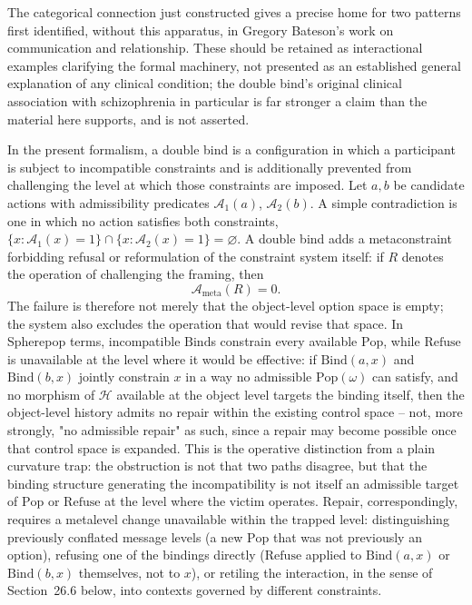 \documentclass[11pt]{article}
\newcommand{\Pop}{\mathrm{Pop}}
\newcommand{\Refuse}{\mathrm{Refuse}}
\newcommand{\Bind}{\mathrm{Bind}}
\begin{document}
The categorical connection just constructed gives a precise home for two patterns first identified, without this apparatus, in Gregory Bateson's work on communication and relationship. These should be retained as interactional examples clarifying the formal machinery, not presented as an established general explanation of any clinical condition; the double bind's original clinical association with schizophrenia in particular is far stronger a claim than the material here supports, and is not asserted.

In the present formalism, a double bind is a configuration in which a participant is subject to incompatible constraints and is additionally prevented from challenging the level at which those constraints are imposed. Let $a, b$ be candidate actions with admissibility predicates $\mathcal{A}_1(a)$, $\mathcal{A}_2(b)$. A simple contradiction is one in which no action satisfies both constraints, $\{x : \mathcal{A}_1(x) = 1\} \cap \{x : \mathcal{A}_2(x) = 1\} = \varnothing$. A double bind adds a metaconstraint forbidding refusal or reformulation of the constraint system itself: if $R$ denotes the operation of challenging the framing, then
\[
\mathcal{A}_{\mathrm{meta}}(R) = 0.
\]
The failure is therefore not merely that the object-level option space is empty; the system also excludes the operation that would revise that space. In Spherepop terms, incompatible $\Bind$s constrain every available $\Pop$, while $\Refuse$ is unavailable at the level where it would be effective: if $\Bind(a,x)$ and $\Bind(b,x)$ jointly constrain $x$ in a way no admissible $\Pop(\omega)$ can satisfy, and no morphism of $\mathcal{H}$ available at the object level targets the binding itself, then the object-level history admits no repair within the existing control space -- not, more strongly, "no admissible repair" as such, since a repair may become possible once that control space is expanded. This is the operative distinction from a plain curvature trap: the obstruction is not that two paths disagree, but that the binding structure generating the incompatibility is not itself an admissible target of $\Pop$ or $\Refuse$ at the level where the victim operates. Repair, correspondingly, requires a metalevel change unavailable within the trapped level: distinguishing previously conflated message levels (a new $\Pop$ that was not previously an option), refusing one of the bindings directly ($\Refuse$ applied to $\Bind(a,x)$ or $\Bind(b,x)$ themselves, not to $x$), or retiling the interaction, in the sense of Section~26.6 below, into contexts governed by different constraints.
\end{document}
